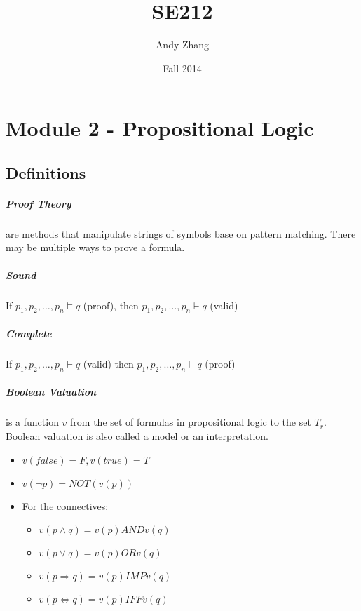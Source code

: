 \documentclass[12pt]{report}
\title{SE212}
\author{{Andy Zhang}}
\date{{Fall 2014}}
\begin{document}
\maketitle
\tableofcontents
\chapter{Module 2 - Propositional Logic}
  \section{Definitions}
    \paragraph{Proof Theory} are methods that manipulate strings of symbols
    base on pattern matching. There may be multiple ways to prove a formula.

    \paragraph{Sound} If $p_1, p_2,\ldots,p_n \models q$ (proof), then $p_1,
    p_2,\ldots,p_n \vdash q$ (valid)

    \paragraph{Complete} If $p_1, p_2,\ldots,p_n \vdash q$ (valid) then
    $p_1,p_2,\ldots,p_n \models q$ (proof)

    \paragraph{Boolean Valuation} is a function $v$ from the set of
    formulas in propositional logic to the set $T_r$. Boolean valuation is
    also called a model or an interpretation.
    \begin{itemize}
      \item $v(false) = F, v(true) = T$
      \item $v(\lnot p) = NOT (v(p))$
      \item For the connectives:
      \begin{itemize}
        \item $v(p\land q) = v(p) AND v(q)$
        \item $v(p\lor q) = v(p) OR v(q)$
        \item $v(p\Rightarrow q) = v(p) IMP v(q)$
        \item $v(p\Leftrightarrow q) = v(p) IFF v(q)$
      \end{itemize}
    \end{itemize}
\end{document}
